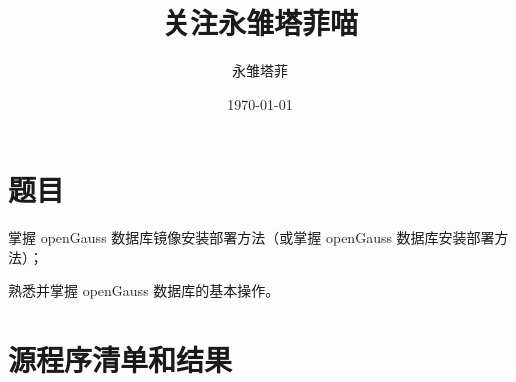 \documentclass[hyperref,UTF8,12pt,a4paper]{ctexart}
\title{关注永雏塔菲喵}
\author{永雏塔菲}
\date{\today}
\begin{document}
\maketitle
\newpage

\section{题目}

掌握 openGauss 数据库镜像安装部署方法（或掌握 openGauss 数据库安装部署方法）； 

熟悉并掌握 openGauss 数据库的基本操作。

\section{源程序清单和结果}
\end{document}
